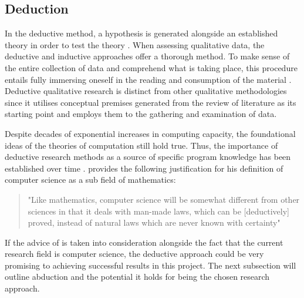 \subsection{Deduction}
\par{In the deductive method, a hypothesis is generated alongside an established theory in order to test the theory \citep{saunders2009research}. When assessing qualitative data, the deductive and inductive approaches offer a thorough method. To make sense of the entire collection of data and comprehend what is taking place, this procedure entails fully immersing oneself in the reading and consumption of the material \citep{azungah2018qualitative}. Deductive qualitative research is distinct from other qualitative methodologies since it utilises conceptual premises generated from the review of literature as its starting point and employs them to the gathering and examination of data\citep{pearse2019illustration}.}
\par{Despite decades of exponential increases in computing capacity, the foundational ideas of the theories of computation still hold true. Thus, the importance of deductive research methods as a source of specific program knowledge has been established over time \citep{eden2007three}. \cite{knuth1968semantics} provides the following justification for his definition of computer science as a sub field of mathematics:}
\begin{quote}
"Like mathematics, computer science will be somewhat different from other sciences in that it deals with man-made laws, which can be [deductively] proved, instead of natural laws which are never known with certainty"
\end{quote}
\par{If the advice of \cite{knuth1968semantics} is taken into consideration alongside the fact that the current research field is computer science, the deductive approach could be very promising to achieving successful results in this project. The next subsection will outline abduction and the potential it holds for being the chosen research approach.}

